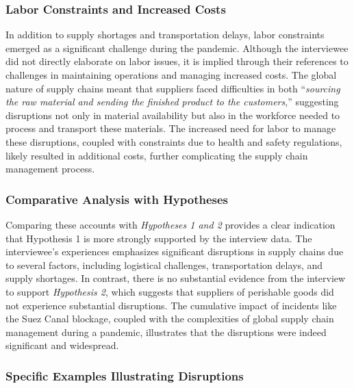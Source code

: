 \subsubsection{Labor Constraints and Increased Costs}

In addition to supply shortages and transportation delays, labor constraints emerged as a significant challenge during the pandemic. Although the interviewee did not directly elaborate on labor issues, it is implied through their references to challenges in maintaining operations and managing increased costs. The global nature of supply chains meant that suppliers faced difficulties in both “\textit{sourcing the raw material and sending the finished product to the customers},” suggesting disruptions not only in material availability but also in the workforce needed to process and transport these materials. The increased need for labor to manage these disruptions, coupled with constraints due to health and safety regulations, likely resulted in additional costs, further complicating the supply chain management process.

\subsubsection{Comparative Analysis with Hypotheses}

Comparing these accounts with \textit{Hypotheses 1 and 2} provides a clear indication that Hypothesis 1 is more strongly supported by the interview data. The interviewee's experiences emphasizes significant disruptions in supply chains due to several factors, including logistical challenges, transportation delays, and supply shortages. In contrast, there is no substantial evidence from the interview to support \textit{Hypothesis 2}, which suggests that suppliers of perishable goods did not experience substantial disruptions. The cumulative impact of incidents like the Suez Canal blockage, coupled with the complexities of global supply chain management during a pandemic, illustrates that the disruptions were indeed significant and widespread.

\subsubsection{Specific Examples Illustrating Disruptions}

